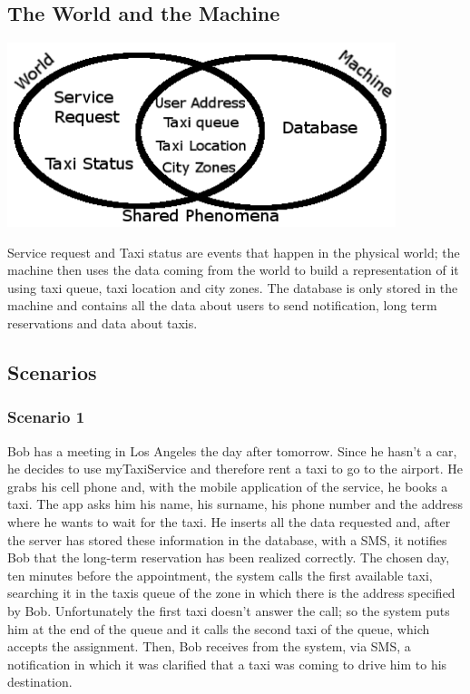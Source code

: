 		\subsection{The World and the Machine}
		\begin{center}
			\includegraphics[width=0.85\textwidth]{./images/ellissi}
		\end{center}
		Service request and Taxi status are events that happen in the physical world; the machine then uses the data coming from the world to build a representation of it using taxi queue, taxi location and city zones. The database is only stored in the machine and contains all the data about users to send notification, long term reservations and data about taxis.
	\subsection{Scenarios}
		\subsubsection{Scenario 1}
		Bob has a meeting in Los Angeles the day after tomorrow. Since he hasn't a car, he decides to use myTaxiService and therefore rent a taxi to go to the airport. He grabs his cell phone and, with the mobile application of the service, he books a taxi. The app asks him his name, his surname, his phone number and the address where he wants to wait for the taxi. He inserts all the data requested and, after the server has stored these information in the database, with a SMS, it notifies Bob that the long-term reservation has been realized correctly. 
		The chosen day, ten minutes before the appointment, the system calls the first available taxi, searching it in the taxis queue of the zone in which there is the address specified by Bob. Unfortunately the first taxi doesn't answer the call; so the system puts him at the end of the queue and it calls the second taxi of the queue, which accepts the assignment. Then, Bob receives from the system, via SMS, a notification in which it was clarified that a taxi was coming to drive him to his destination.
		
